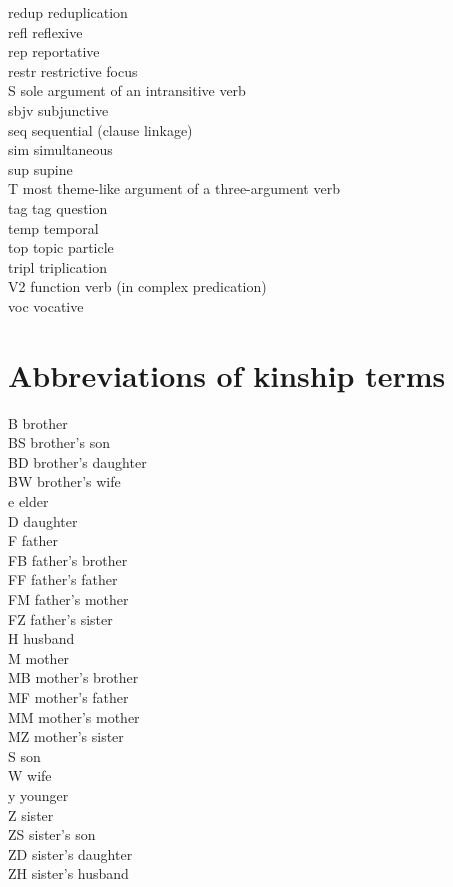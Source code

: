 \begin{refsection}
\begin{multicols}{2}
{\sc redup} reduplication\\
{\sc refl} reflexive\\
{\sc rep}  reportative\\
{\sc restr} restrictive focus\\
S 	 sole argument of an intransitive verb\\
{\sc sbjv}  subjunctive\\
{\sc seq} sequential (clause linkage)\\
{\sc sim}  simultaneous\\
{\sc sup}  supine\\
T  most theme-like argument of a three-argument verb\\
{\sc tag}  tag question\\
{\sc temp} temporal\\
{\sc top}  topic particle\\
{\sc tripl} triplication\\
{\sc V2} function verb (in complex predication)\\
{\sc voc} vocative\\
\setlength{\parindent}{10pt}
\end{multicols}

\section*{Abbreviations of kinship terms}
\begin{multicols}{2}\enlargethispage{2\baselineskip}
\setlength{\parindent}{0pt}
B brother\\
BS brother's son\\
BD brother's daughter\\
BW brother's wife\\
e elder\\
D daughter\\
F  father\\
FB  father's brother\\
FF  father's father\\
FM  father's mother\\
FZ  father's sister\\
H husband\\
M  mother\\
MB  mother's brother\\
MF  mother's father\\
MM  mother's mother\\
MZ  mother's sister\\
S  son\\
W wife\\
y  younger\\
Z  sister\\
ZS sister's son\\
ZD sister's daughter\\
ZH sister's husband\\
\setlength{\parindent}{10pt}
\end{multicols}


\printbibliography[heading=subbibliography]
\end{refsection}